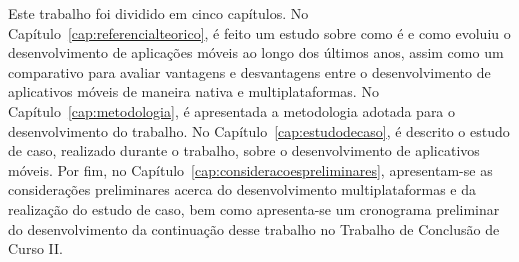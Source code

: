 Este trabalho foi dividido em cinco capítulos. %
No Capítulo~\ref{cap:referencialteorico}, é feito um estudo sobre como é e como evoluiu o desenvolvimento de aplicações 
móveis ao longo dos últimos anos, assim como um comparativo para avaliar vantagens e desvantagens entre o desenvolvimento 
de aplicativos móveis de maneira nativa e multiplataformas. 
No Capítulo~\ref{cap:metodologia}, é apresentada a metodologia adotada para o desenvolvimento do trabalho.  
No Capítulo~\ref{cap:estudodecaso}, é descrito o estudo de caso, realizado durante o trabalho, sobre o desenvolvimento de aplicativos móveis.
Por fim, no Capítulo~\ref{cap:consideracoespreliminares}, apresentam-se as considerações preliminares acerca do desenvolvimento multiplataformas e da realização do estudo de caso, bem como apresenta-se um 
cronograma preliminar do desenvolvimento da continuação desse trabalho no Trabalho de Conclusão de Curso II. 